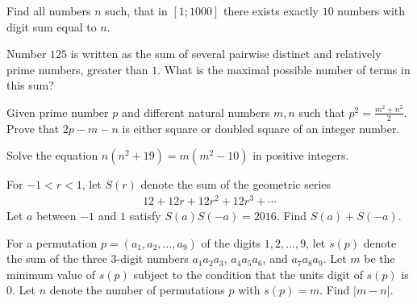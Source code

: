 \begin{problem}
	Find all numbers $n$ such, that in $[1;1000]$ there exists exactly $10$ numbers with digit sum equal to $n$. %
\end{problem}

\begin{problem}
	Number $125$ is written as the sum of several pairwise distinct and relatively prime numbers, greater than $1$. What is the maximal possible number of terms in this sum? %
\end{problem}

\begin{problem}
	Given prime number $p$ and different natural numbers $m, n$ such that $p^2=\frac{m^2+n^2}{2}$. Prove that $2p-m-n$ is either square or doubled square of an integer number. %
\end{problem}

\begin{problem}
	Solve the equation $n(n^2+19)=m(m^2-10)$ in positive integers. %
\end{problem}

\begin{problem}
	For $-1 < r < 1$, let $S(r)$ denote the sum of the geometric series
		\begin{align*}
			12 + 12r + 12r^2 + 12r^3 + \cdots
		\end{align*}
	Let $a$ between $-1$ and $1$ satisfy $S(a)S(-a)=2016$. Find $S(a) + S(-a)$. %
\end{problem}

\begin{problem}
	For a permutation $p = (a_1,a_2,\ldots,a_9)$ of the digits $1,2,\ldots,9$, let $s(p)$ denote the sum of the three $3$-digit numbers $a_1a_2a_3$, $a_4a_5a_6$, and $a_7a_8a_9$. Let $m$ be the minimum value of $s(p)$ subject to the condition that the units digit of $s(p)$ is $0$. Let $n$ denote the number of permutations $p$ with $s(p) = m$. Find $|m - n|$. %
\end{problem}

